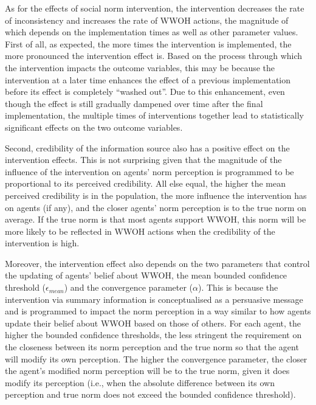 \documentclass[
  11pt,
]{article}
\begin{document}
As for the effects of social norm intervention, the intervention
decreases the rate of inconsistency and increases the rate of WWOH
actions, the magnitude of which depends on the implementation times as
well as other parameter values. First of all, as expected, the more
times the intervention is implemented, the more pronounced the
intervention effect is. Based on the process through which the
intervention impacts the outcome variables, this may be because the
intervention at a later time enhances the effect of a previous
implementation before its effect is completely ``washed out''. Due to
this enhancement, even though the effect is still gradually dampened
over time after the final implementation, the multiple times of
interventions together lead to statistically significant effects on the
two outcome variables.

Second, credibility of the information source also has a positive effect
on the intervention effects. This is not surprising given that the
magnitude of the influence of the intervention on agents' norm
perception is programmed to be proportional to its perceived
credibility. All else equal, the higher the mean perceived credibility
is in the population, the more influence the intervention has on agents
(if any), and the closer agents' norm perception is to the true norm on
average. If the true norm is that most agents support WWOH, this norm
will be more likely to be reflected in WWOH actions when the credibility
of the intervention is high.

Moreover, the intervention effect also depends on the two parameters
that control the updating of agents' belief about WWOH, the mean bounded
confidence threshold (\(\epsilon_{mean}\)) and the convergence parameter
(\(\alpha\)). This is because the intervention via summary information
is conceptualised as a persuasive message and is programmed to impact
the norm perception in a way similar to how agents update their belief
about WWOH based on those of others. For each agent, the higher the
bounded confidence thresholds, the less stringent the requirement on the
closeness between its norm perception and the true norm so that the
agent will modify its own perception. The higher the convergence
parameter, the closer the agent's modified norm perception will be to
the true norm, given it does modify its perception (i.e., when the
absolute difference between its own perception and true norm does not
exceed the bounded confidence threshold).
\end{document}
